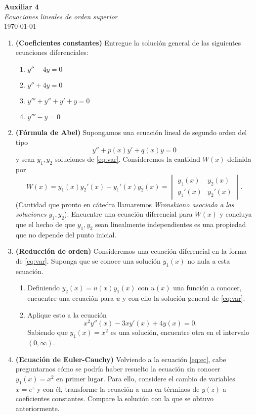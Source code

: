 \documentclass{article}
\begin{document}


\begin{center}
    \Huge{\textbf{Auxiliar 4}}\\
\textit{\large{Ecuaciones lineales de orden superior}}\\
    \normalsize
    \today
\end{center}

\begin{enumerate}
	\item \textbf{(Coeficientes constantes)} Entregue la solución general de las siguientes ecuaciones diferenciales:
		\begin{enumerate}
			\item \(y'' - 4y = 0\)
			\item \(y'' + 4y = 0\)
			\item \(y''' + y'' + y' + y = 0\)
			\item \(y''' - y = 0\)
		\end{enumerate}
	\item \textbf{(Fórmula de Abel)} Supongamos una ecuación lineal de segundo orden del tipo
		\begin{equation} \label{eq:var}
			y'' + p(x)y' + q(x) y = 0
		\end{equation}
		y sean \(y_1, y_2\) soluciones de \eqref{eq:var}. Consideremos la cantidad \(W(x)\) definida por
		\[
			W(x) = y_1(x)y_2'(x) - y_1'(x)y_2(x) = \begin{vmatrix}
				y_1(x) & y_2(x) \\ y_1'(x) & y_2'(x)
			\end{vmatrix}.
		\]
		(Cantidad que pronto en cátedra llamaremos \textit{Wronskiano asociado a las soluciones \(y_1, y_2\)}). Encuentre una ecuación diferencial para \(W(x)\) y concluya que el hecho de que \(y_1, y_2\) sean linealmente independientes es una propiedad que no depende del punto inicial.
	\item \textbf{(Reducción de orden)} Consideremos una ecuación diferencial en la forma de \eqref{eq:var}. Suponga que se conoce una solución \(y_1(x)\) no nula a esta ecuación.
		\begin{enumerate}
			\item Definiendo \(y_2(x) = u(x) y_1(x)\) con \(u(x)\) una función a conocer, encuentre una ecuación para \(u\) y con ello la solución general de \eqref{eq:var}.
			\item Aplique esto a la ecuación
				\begin{equation} \label{eq:ec}
					x^2y''(x) - 3xy'(x) + 4y(x) = 0.
				\end{equation}
				Sabiendo que \(y_1(x) = x^2\) es una solución, encuentre otra en el intervalo \((0, \infty)\).
		\end{enumerate}
	\item \textbf{(Ecuación de Euler-Cauchy)} Volviendo a la ecuación \eqref{eq:ec}, cabe preguntarnos cómo se podría haber resuelto la ecuación sin conocer \(y_1(x) = x^2\) en primer lugar. Para ello, considere el cambio de variables \(x = e^z\) y con él, transforme la ecuación a una en términos de \(y(z)\) a coeficientes constantes. Compare la solución con la que se obtuvo anteriormente.

\end{enumerate}
\end{document}
